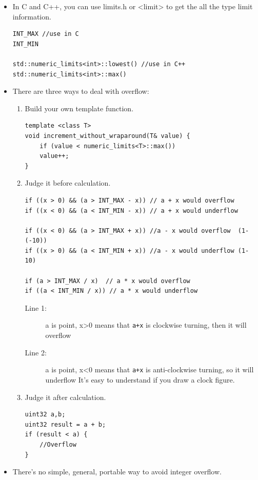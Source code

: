 \documentclass[a4paper,11pt,twoside]{book}
\begin{document}
\begin{itemize}
	\item In C and C++, you can use limits.h or <limit> to get the all the type limit information.
	
\begin{lstlisting}[numbers=none]
INT_MAX //use in C
INT_MIN

std::numeric_limits<int>::lowest() //use in C++
std::numeric_limits<int>::max()
\end{lstlisting}
	
	\item There are three ways to deal with overflow:
	\begin{enumerate}
		\item Build your own template function.
\begin{lstlisting}[numbers=none]
template <class T>
void increment_without_wraparound(T& value) {
	if (value < numeric_limits<T>::max())
	value++;
}
\end{lstlisting}

		\item  Judge it before calculation.



\begin{lstlisting}
if ((x > 0) && (a > INT_MAX - x)) // a + x would overflow 
if ((x < 0) && (a < INT_MIN - x)) // a + x would underflow

if ((x < 0) && (a > INT_MAX + x)) //a - x would overflow  (1-(-10))
if ((x > 0) && (a < INT_MIN + x)) //a - x would underflow (1-10)

if (a > INT_MAX / x)  // a * x would overflow 
if ((a < INT_MIN / x)) // a * x would underflow 
\end{lstlisting}
\begin{description}
	\item[Line 1:] a is point, x>0 means that \texttt{a+x} is clockwise turning, then it will overflow
	\item[Line 2:] a is point, x<0 means that \texttt{a+x} is anti-clockwise turning,  so it will underflow It's easy to understand if you draw a clock figure.
\end{description}
		
		\item Judge it after calculation.
\begin{lstlisting}[numbers = none]
uint32 a,b;
uint32 result = a + b;
if (result < a) {
	//Overflow
}
\end{lstlisting}
\end{enumerate}
	
	\item There's no simple, general, portable way to avoid integer overflow.
	

\end{itemize}
\end{document}
